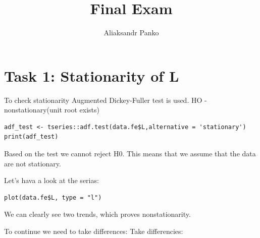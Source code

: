 \documentclass[12pt,a4paper]{article}
\author{Aliaksandr Panko}
\title{Final Exam}
\begin{document}
	\maketitle
	\tableofcontents
\section{Task 1: Stationarity of L}
To check stationarity Augmented Dickey-Fuller test is used. HO - nonstationary(unit root exists)
\begin{verbatim}
adf_test <- tseries::adf.test(data.fe$L,alternative = 'stationary') 
print(adf_test)
\end{verbatim}
\begin{center}
\end{center}
Based on the test we cannot reject H0. This means that we assume that the data are not stationary.

Let's hava a look at the serias:
\begin{verbatim}
plot(data.fe$L, type = "l")
\end{verbatim}
\begin{center}
\end{center}
We can clearly see two trends, which proves nonstationarity.

To continue we need to take differences:
Take differencies:
\end{document}

